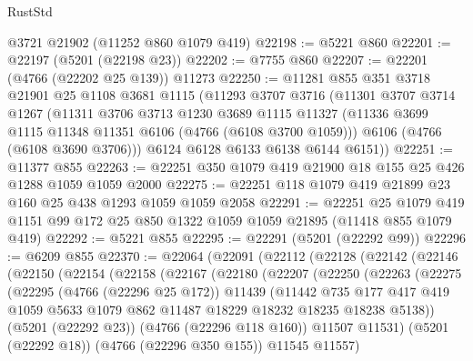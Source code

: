 \begin{lexlean}{RustStd}
\begin{coremodule}
    @3721
    @21902
    (@11252 @860 @1079 @419)
@22198 := @5221 @860
@22201 := @22197 (@5201 (@22198 @23))
@22202 := @7755 @860
@22207 := @22201 (@4766 (@22202 @25 @139)) @11273
@22250 := @11281
    @855
    @351
    @3718
    @21901
    @25
    @1108
    @3681
    @1115
    (@11293
      @3707
      @3716
      (@11301
        @3707
        @3714
        @1267
        (@11311
          @3706
          @3713
          @1230
          @3689
          @1115
          @11327
          (@11336 @3699 @1115 @11348 @11351 @6106 (@4766 (@6108 @3700 @1059)))
          @6106
          (@4766 (@6108 @3690 @3706)))
        @6124
        @6128
        @6133
        @6138
        @6144
        @6151))
@22251 := @11377 @855
@22263 := @22251 @350 @1079 @419 @21900 @18 @155 @25 @426 @1288 @1059 @1059 @2000
@22275 := @22251 @118 @1079 @419 @21899 @23 @160 @25 @438 @1293 @1059 @1059 @2058
@22291 := @22251
    @25
    @1079
    @419
    @1151
    @99
    @172
    @25
    @850
    @1322
    @1059
    @1059
    @21895
    (@11418 @855 @1079 @419)
@22292 := @5221 @855
@22295 := @22291 (@5201 (@22292 @99))
@22296 := @6209 @855
@22370 := @22064
    (@22091
      (@22112
        (@22128
          (@22142
            (@22146
              (@22150
                (@22154
                  (@22158
                    (@22167
                      (@22180
                        (@22207
                          (@22250
                            (@22263
                              (@22275
                                (@22295
                                  (@4766 (@22296 @25 @172))
                                  @11439
                                  (@11442
                                    @735
                                    @177
                                    @417
                                    @419
                                    @1059
                                    @5633
                                    @1079
                                    @862
                                    @11487
                                    @18229
                                    @18232
                                    @18235
                                    @18238
                                    @5138))
                                (@5201 (@22292 @23))
                                (@4766 (@22296 @118 @160))
                                @11507
                                @11531)
                              (@5201 (@22292 @18))
                              (@4766 (@22296 @350 @155))
                              @11545
                              @11557)

\end{coremodule}
\end{lexlean}
